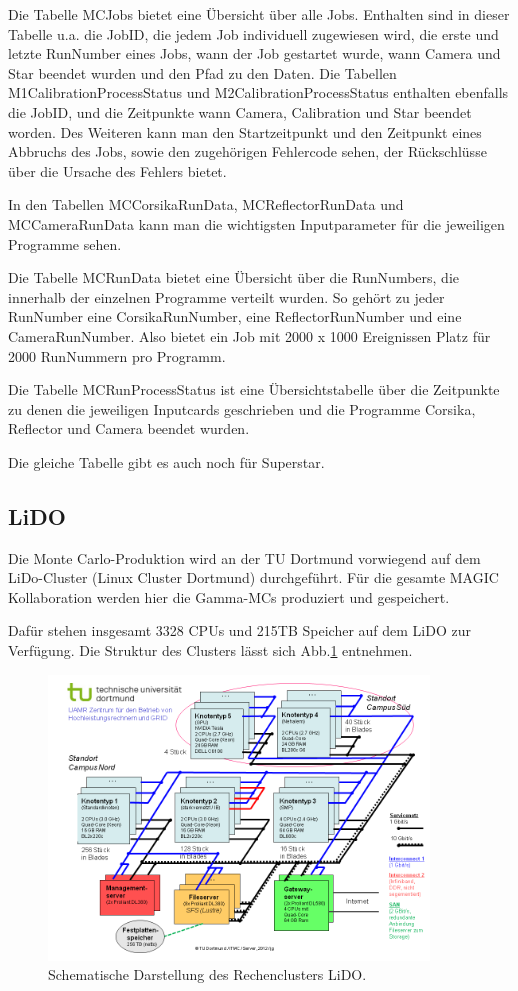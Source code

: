 Die Tabelle MCJobs bietet eine Übersicht über alle Jobs. 
Enthalten sind in dieser Tabelle u.a. die JobID, die jedem Job individuell zugewiesen wird, die erste und letzte RunNumber eines Jobs, wann der Job gestartet wurde, wann Camera und Star beendet wurden und den Pfad zu den Daten.\newline
Die Tabellen M1CalibrationProcessStatus und M2CalibrationProcessStatus enthalten ebenfalls die JobID, und die Zeitpunkte wann Camera, Calibration und Star beendet worden. 
Des Weiteren kann man den Startzeitpunkt und den Zeitpunkt eines Abbruchs des Jobs, sowie den zugehörigen Fehlercode sehen, der Rückschlüsse über die Ursache des Fehlers bietet.

In den Tabellen MCCorsikaRunData, MCReflectorRunData und MCCameraRunData kann man die wichtigsten Inputparameter für die jeweiligen Programme sehen.

Die Tabelle MCRunData bietet eine Übersicht über die RunNumbers, die innerhalb der einzelnen Programme verteilt wurden. 
So gehört zu jeder RunNumber eine CorsikaRunNumber, eine ReflectorRunNumber und eine CameraRunNumber.
Also bietet ein Job mit 2000 x 1000 Ereignissen Platz für 2000 RunNummern pro Programm.

Die Tabelle MCRunProcessStatus ist eine Übersichtstabelle über die Zeitpunkte zu denen die jeweiligen Inputcards geschrieben und die Programme Corsika, Reflector und Camera beendet wurden.

Die gleiche Tabelle gibt es auch noch für Superstar. 


\subsection{LiDO}
Die Monte Carlo-Produktion wird an der TU Dortmund vorwiegend auf dem LiDo-Cluster (Linux Cluster Dortmund) durchgeführt. 
Für die gesamte MAGIC Kollaboration werden hier die Gamma-MCs produziert und gespeichert.

Dafür stehen insgesamt 3328 CPUs und 215TB Speicher auf dem LiDO zur Verfügung.
Die Struktur des Clusters lässt sich Abb.\ref{LiDo} entnehmen.

\begin{figure}[!h]
    \centering
    \includegraphics[width=0.9\textwidth]{./Plots/03_MonteCarlos/LiDO.png}
    \caption{Schematische Darstellung des Rechenclusters LiDO.\cite{LiDO}}
    \label{LiDo}
\end{figure}


